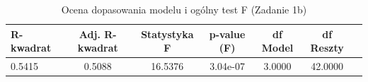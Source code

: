 \begin{table}[H]
\caption{Ocena dopasowania modelu i ogólny test F (Zadanie 1b)}
\label{tab:zad1_fit}
\begin{tabular}{lcccccc}
\toprule
R-kwadrat & Adj. R-kwadrat & Statystyka F & p-value (F) & df Model & df Reszty \\
\midrule
0.5415 & 0.5088 & 16.5376 & 3.04e-07 & 3.0000 & 42.0000 \\
\bottomrule
\end{tabular}
\end{table}
